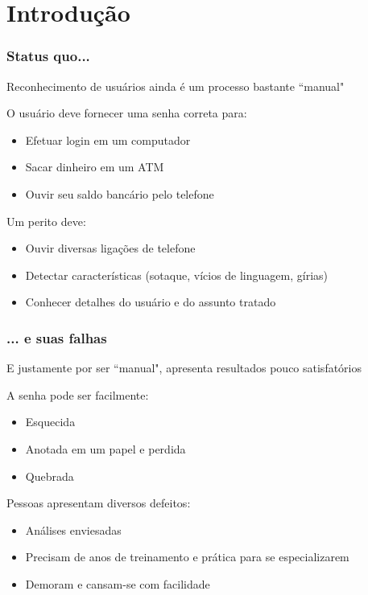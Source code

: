 \section{Introdução}
\label{sec:intro}

\contentscurrent

\begin{frame}
\frametitle{Status quo...}
\begin{description}
    \item Reconhecimento de usuários ainda é um processo bastante ``manual"
    \pause
    \item[Verificação] O usuário deve fornecer uma senha correta para:
    \pause
    \begin{itemize}
        \item Efetuar login em um computador
        \pause
        \item Sacar dinheiro em um ATM
        \pause
        \item Ouvir seu saldo bancário pelo telefone
        \pause
    \end{itemize}
    \item[Identificação] Um perito deve:
    \pause
    \begin{itemize}
        \item Ouvir diversas ligações de telefone
        \pause
        \item Detectar características (sotaque, vícios de linguagem, gírias)
        \pause
        \item Conhecer detalhes do usuário e do assunto tratado
    \end{itemize}
\end{description}
\end{frame}

\begin{frame}
\frametitle{... e suas falhas}
\begin{description}
    \item E justamente por ser ``manual", apresenta resultados pouco satisfatórios
    \pause
    \item[Verificação] A senha pode ser facilmente:
    \pause
    \begin{itemize}
        \item Esquecida
        \pause
        \item Anotada em um papel e perdida
        \pause
        \item Quebrada
        \pause
    \end{itemize}
    \item[Identificação] Pessoas apresentam diversos defeitos:
    \pause
    \begin{itemize}
        \item Análises enviesadas
        \pause
        \item Precisam de anos de treinamento e prática para se especializarem
        \pause
        \item Demoram e cansam-se com facilidade
    \end{itemize}
\end{description}
\end{frame}

